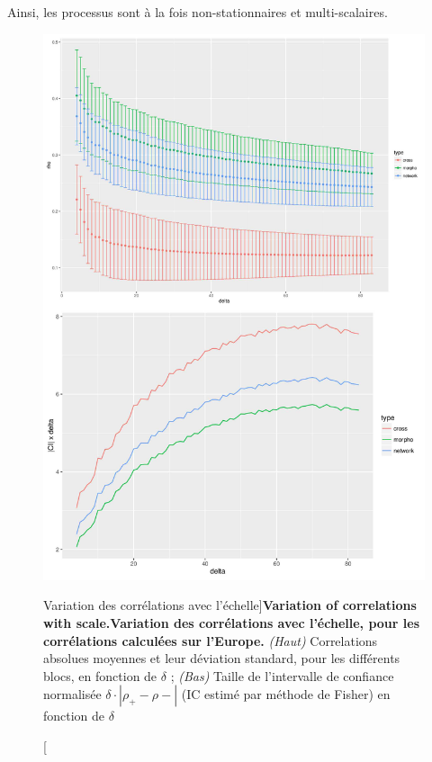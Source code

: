 Ainsi, les processus sont à la fois non-stationnaires et multi-scalaires.


\begin{figure}
\includegraphics[width=\linewidth]{Figures/Final/4-1-3-fig-staticcorrs-corrsdistrib}
\caption[Variation of correlations with scale][Variation des corrélations avec l'échelle]{\textbf{Variation of correlations with scale.}\label{fig:staticcorrs:corrsdistrib}}{\textbf{Variation des corrélations avec l'échelle, pour les corrélations calculées sur l'Europe.} \textit{(Haut)} Correlations absolues moyennes et leur déviation standard, pour les différents blocs, en fonction de $\delta$ ; \textit{(Bas)} Taille de l'intervalle de confiance normalisée $\delta\cdot \left|\rho_+ - \rho -\right|$ (IC estimé par méthode de Fisher) en fonction de $\delta$ \label{fig:staticcorrs:corrsdistrib}}
\end{figure}



